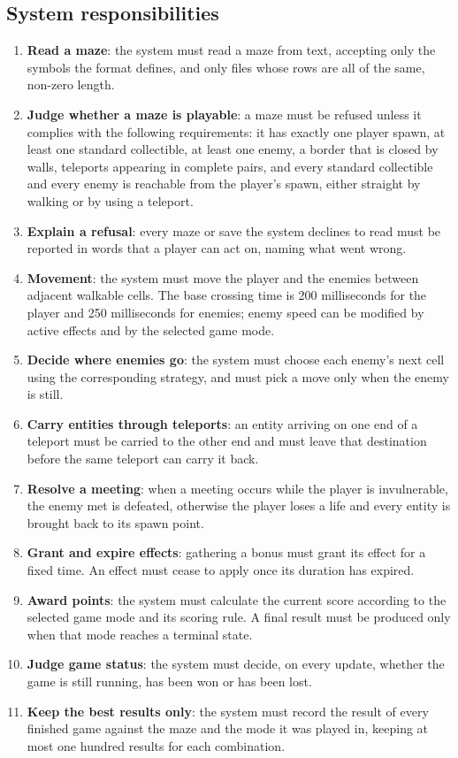 \subsection{System responsibilities}

\begin{enumerate}[label=\textbf{FR-S\arabic*}]
  \item \textbf{Read a maze}: the system must read a maze from text, accepting only the symbols the format defines,
  and only files whose rows are all of the same, non-zero length.
  \item \textbf{Judge whether a maze is playable}: a maze must be refused unless it complies with the following
  requirements: it has exactly one player spawn, at least one standard collectible, at least one enemy, a border that is
  closed by walls, teleports appearing in complete pairs, and every standard collectible and every enemy is reachable
  from the player's spawn, either straight by walking or by using a teleport.
  \item \textbf{Explain a refusal}: every maze or save the system declines to read must be reported in words that a
  player can act on, naming what went wrong.
  \item \textbf{Movement}: the system must move the player and the enemies between adjacent walkable cells. The base
  crossing time is 200 milliseconds for the player and 250 milliseconds for enemies; enemy speed can be modified by
  active effects and by the selected game mode.
  \item \textbf{Decide where enemies go}: the system must choose each enemy's next cell using the corresponding
  strategy, and must pick a move only when the enemy is still.
  \item \textbf{Carry entities through teleports}: an entity arriving on one end of a teleport must be carried to
  the other end and must leave that destination before the same teleport can carry it back.
  \item \textbf{Resolve a meeting}: when a meeting occurs while the player is invulnerable, the enemy met is defeated,
  otherwise the player loses a life and every entity is brought back to its spawn point.
  \item \textbf{Grant and expire effects}: gathering a bonus must grant its effect for a fixed time. An effect
  must cease to apply once its duration has expired.
  \item \textbf{Award points}: the system must calculate the current score according to the selected game mode and
  its scoring rule. A final result must be produced only when that mode reaches a terminal state.
  \item \textbf{Judge game status}: the system must decide, on every update, whether the game is still running, has
  been won or has been lost.
  \item \textbf{Keep the best results only}: the system must record the result of every finished game against the
  maze and the mode it was played in, keeping at most one hundred results for each combination.
\end{enumerate}

